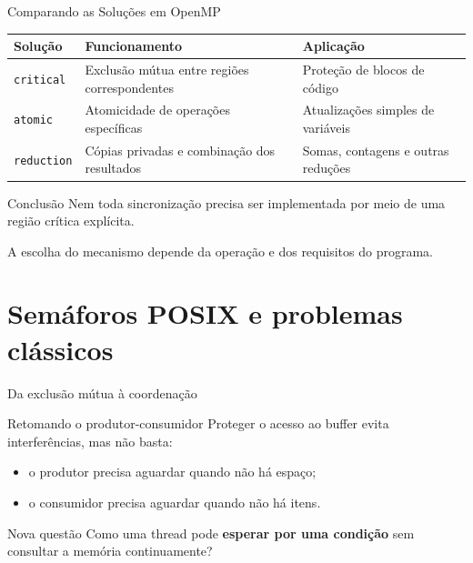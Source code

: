 \documentclass[aspectratio=169,11pt]{beamer}
\begin{document}

\begin{frame}{Comparando as Soluções em OpenMP}

\small
\begin{center}
\begin{tabular}{p{2.0cm}|p{3.3cm}|p{4.0cm}}
\hline
\textbf{Solução} &
\textbf{Funcionamento} &
\textbf{Aplicação} \\
\hline
\texttt{critical} &
Exclusão mútua entre regiões correspondentes &
Proteção de blocos de código \\
\hline
\texttt{atomic} &
Atomicidade de operações específicas &
Atualizações simples de variáveis \\
\hline
\texttt{reduction} &
Cópias privadas e combinação dos resultados &
Somas, contagens e outras reduções \\
\hline
\end{tabular}
\end{center}

\vspace{0.4cm}

\begin{block}{Conclusão}
Nem toda sincronização precisa ser implementada
por meio de uma região crítica explícita.

A escolha do mecanismo depende da operação
e dos requisitos do programa.
\end{block}

\end{frame}



\section{Semáforos POSIX e problemas clássicos}
\begin{frame}{Da exclusão mútua à coordenação}
\begin{block}{Retomando o produtor-consumidor}
Proteger o acesso ao buffer evita interferências, mas não basta:
\begin{itemize}
\item o produtor precisa aguardar quando não há espaço;
\item o consumidor precisa aguardar quando não há itens.
\end{itemize}
\end{block}
\vspace{0.2cm}
\begin{alertblock}{Nova questão}
Como uma thread pode \textbf{esperar por uma condição} sem consultar a memória continuamente?
\end{alertblock}
\end{frame}
\end{document}

